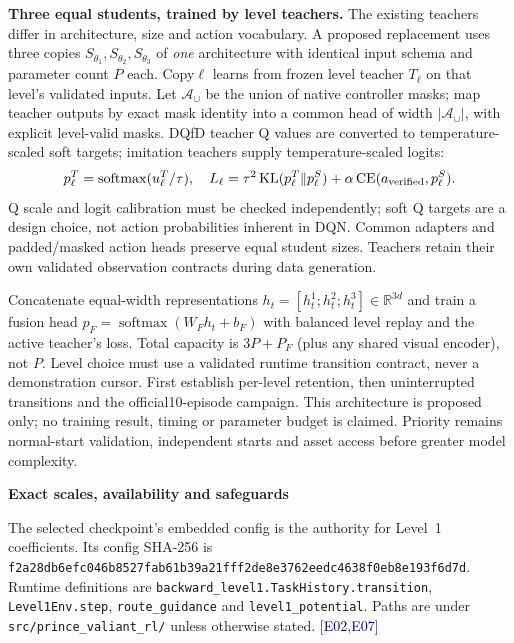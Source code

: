 \documentclass[11pt,a4paper]{article}
\newcommand{\topic}[2]{\vspace*{-4mm}{\small\color{teal}\textbf{#1}}\par{\LARGE\bfseries #2}\par\vspace{3mm}}
\newcommand{\ev}[1]{{\small\textcolor{navy}{[#1]}}}
\newcommand{\pathref}[1]{\nolinkurl{#1}}
\begin{document}
\textbf{Three equal students, trained by level teachers.} The existing teachers differ in architecture, size and action vocabulary. A proposed replacement uses three copies $S_{\theta_1},S_{\theta_2},S_{\theta_3}$ of \emph{one} architecture with identical input schema and parameter count $P$ each. Copy$\ell$ learns from frozen level teacher $T_\ell$ on that level's validated inputs. Let $\mathcal A_\cup$ be the union of native controller masks; map teacher outputs by exact mask identity into a common head of width $|\mathcal A_\cup|$, with explicit level-valid masks. DQfD teacher Q values are converted to temperature-scaled soft targets; imitation teachers supply temperature-scaled logits:
\begin{equation}\label{eq:distill}
 p^T_\ell=\operatorname{softmax}(u^T_\ell/\tau),\quad
 L_\ell=\tau^2\operatorname{KL}(p^T_\ell\|p^S_\ell)+\alpha\operatorname{CE}(a_{\rm verified},p^S_\ell).
\end{equation}
Q scale and logit calibration must be checked independently; soft Q targets are a design choice, not action probabilities inherent in DQN. Common adapters and padded/masked action heads preserve equal student sizes. Teachers retain their own validated observation contracts during data generation.

Concatenate equal-width representations $h_t=[h_t^1;h_t^2;h_t^3]\in\mathbb R^{3d}$ and train a fusion head $p_F=\operatorname{softmax}(W_Fh_t+b_F)$ with balanced level replay and the active teacher's loss. Total capacity is $3P+P_F$ (plus any shared visual encoder), not $P$. Level choice must use a validated runtime transition contract, never a demonstration cursor. First establish per-level retention, then uninterrupted transitions and the official10-episode campaign. This architecture is proposed only; no training result, timing or parameter budget is claimed. Priority remains normal-start validation, independent starts and asset access before greater model complexity.

\clearpage
\appendix
\topic{APPENDIX A / REWARD CONTRACTS}{Exact scales, availability and safeguards}
\begingroup\small
The selected checkpoint's embedded config is the authority for Level~1 coefficients. Its config SHA-256 is \texttt{f2a28db6efc046b8527fab61b39a21fff2de8e3762eedc4638f0eb8e193f6d7d}. Runtime definitions are \pathref{backward_level1.TaskHistory.transition}, \pathref{Level1Env.step}, \pathref{route_guidance} and \pathref{level1_potential}. Paths are under \pathref{src/prince_valiant_rl/} unless otherwise stated. \ev{E02,E07}
\end{document}
